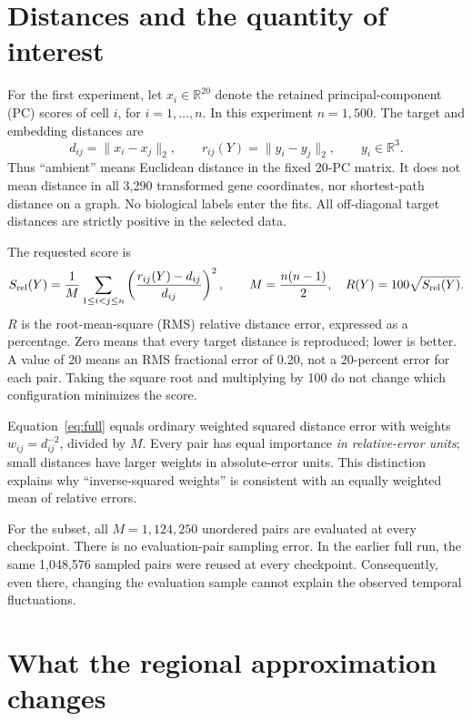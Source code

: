 \documentclass[11pt]{article}
\begin{document}
\section{Distances and the quantity of interest}
For the first experiment, let $x_i\in\mathbb R^{20}$ denote the retained principal-component (PC) scores
of cell $i$, for $i=1,\ldots,n$. In this experiment $n=1,500$.
The target and embedding distances are
\begin{equation}
d_{ij}=\|x_i-x_j\|_2,\qquad
r_{ij}(Y)=\|y_i-y_j\|_2,\qquad y_i\in\mathbb R^3.
\end{equation}
Thus ``ambient'' means Euclidean distance in the fixed 20-PC matrix.
It does not mean distance in all 3,290 transformed gene coordinates, nor
shortest-path distance on a graph. No biological labels enter the fits.
All off-diagonal target distances are strictly positive in the selected data.

The requested score is
\begin{equation}\label{eq:full}
S_{\rm rel}(Y)=\frac1M\sum_{1\leq i<j\leq n}
\left(\frac{r_{ij}(Y)-d_{ij}}{d_{ij}}\right)^2,\qquad
M=\frac{n(n-1)}2,
\quad R(Y)=100\sqrt{S_{\rm rel}(Y)}.
\end{equation}
$R$ is the root-mean-square (RMS) relative distance error, expressed as a
percentage. Zero means that every target distance is reproduced; lower is
better. A value of 20 means an RMS fractional error of 0.20, not a 20-percent
error for each pair. Taking the square root and multiplying by 100 do not
change which configuration minimizes the score.

Equation~\eqref{eq:full} equals ordinary weighted squared distance error with
weights $w_{ij}=d_{ij}^{-2}$, divided by $M$. Every pair has equal importance
\emph{in relative-error units}; small distances have larger weights in
absolute-error units. This distinction explains why ``inverse-squared
weights'' is consistent with an equally weighted mean of relative errors.

For the subset, all $M=1,124,250$ unordered pairs are evaluated at every
checkpoint. There is no evaluation-pair sampling error. In the earlier full
run, the same 1,048,576 sampled pairs were reused at every checkpoint.
Consequently, even there, changing the evaluation sample cannot explain the
observed temporal fluctuations.

\section{What the regional approximation changes}
\end{document}
